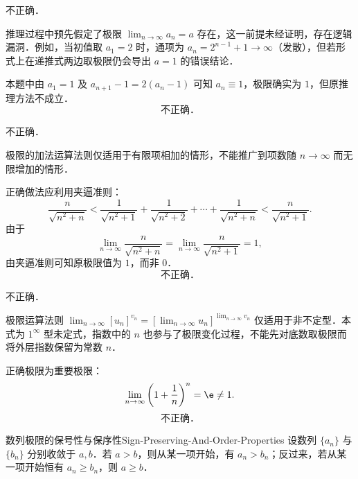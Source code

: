 \begin{solution}
     不正确．

    推理过程中预先假定了极限 $\lim_{n\to\infty} a_n = a$ 存在，这一前提未经证明，存在逻辑漏洞．例如，当初值取 $a_1 = 2$ 时，通项为 $a_n = 2^{n-1} + 1 \to \infty$（发散），但若形式上在递推式两边取极限仍会导出 $a = 1$ 的错误结论．

    本题中由 $a_1 = 1$ 及 $a_{n+1} - 1 = 2(a_n - 1)$ 可知 $a_n \equiv 1$，极限确实为 $1$，但原推理方法不成立．
    \begin{equation}
        \boxed{\text{不正确．}}
    \end{equation}

     不正确．

    极限的加法运算法则仅适用于有限项相加的情形，不能推广到项数随 $n \to \infty$ 而无限增加的情形．

    正确做法应利用夹逼准则：
    \begin{equation}
        \frac{n}{\sqrt{n^2 + n}} < \frac{1}{\sqrt{n^2 + 1}} + \frac{1}{\sqrt{n^2 + 2}} + \cdots + \frac{1}{\sqrt{n^2 + n}} < \frac{n}{\sqrt{n^2 + 1}}.
    \end{equation}
    由于
    \begin{equation}
        \lim_{n\to\infty} \frac{n}{\sqrt{n^2 + n}} = \lim_{n\to\infty} \frac{n}{\sqrt{n^2 + 1}} = 1,
    \end{equation}
    由夹逼准则可知原极限值为 $1$，而非 $0$．
    \begin{equation}
        \boxed{\text{不正确．}}
    \end{equation}

     不正确．

    极限运算法则 $\lim_{n\to\infty} [u_n]^{v_n} = \left[ \lim_{n\to\infty} u_n \right]^{\lim_{n\to\infty} v_n}$ 仅适用于非不定型．本式为 $1^\infty$ 型未定式，指数中的 $n$ 也参与了极限变化过程，不能先对底数取极限而将外层指数保留为常数 $n$．

    正确极限为重要极限：
    \begin{equation}
        \lim_{n\to\infty} \left( 1 + \frac{1}{n} \right)^n = \e \neq 1.
    \end{equation}
    \begin{equation}
        \boxed{\text{不正确．}}
    \end{equation}
\end{solution}

\begin{problem}{数列极限的保号性与保序性}{Sign-Preserving-And-Order-Properties}
    设数列 $\{a_n\}$ 与 $\{b_n\}$ 分别收敛于 $a, b$．若 $a > b$，则从某一项开始，有 $a_n > b_n$；反过来，若从某一项开始恒有 $a_n \geqslant b_n$，则 $a \geqslant b$．
\end{problem}

